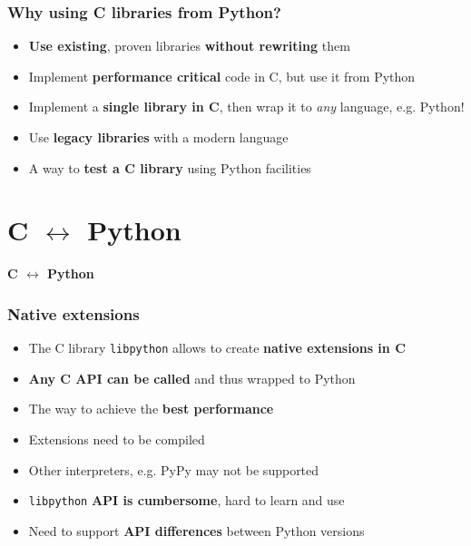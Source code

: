 \documentclass[handout]{beamer}
\begin{document}
\begin{frame}
  \frametitle{Why using C libraries from Python?}

  \begin{itemize}
    \item<1-> \textbf{Use existing}, proven libraries \textbf{without rewriting}
      them
    \item<2-> Implement \textbf{performance critical} code in C, but use it from
      Python
    \item<3-> Implement a \textbf{single library in C}, then wrap it to
      \textit{any} language, e.g. Python!
    \item<4-> Use \textbf{legacy libraries} with a modern language
    \item<5-> A way to \textbf{test a C library} using Python facilities
  \end{itemize}
\end{frame}

\section{C $\leftrightarrow$ Python}

\begin{frame}[plain]{}
  \begin{center}
    \Huge \textbf{C $\leftrightarrow$ Python}
  \end{center}
\end{frame}

\begin{frame}
  \frametitle{Native extensions}

  \begin{itemize}
    \item<1-> The C library \texttt{libpython} allows to create \textbf{native
      extensions in C}
    \item<2-> \textbf{Any C API can be called} and thus wrapped to Python
    \item<3-> The way to achieve the \textbf{best performance}
  \end{itemize}


  \begin{itemize}
    \item<5-> Extensions need to be compiled
    \item<6-> Other interpreters, e.g. PyPy may not be supported
    \item<7-> \texttt{libpython} \textbf{API is cumbersome}, hard to learn and
      use
    \item<8-> Need to support \textbf{API differences} between Python versions
  \end{itemize}
\end{frame}
\end{document}
